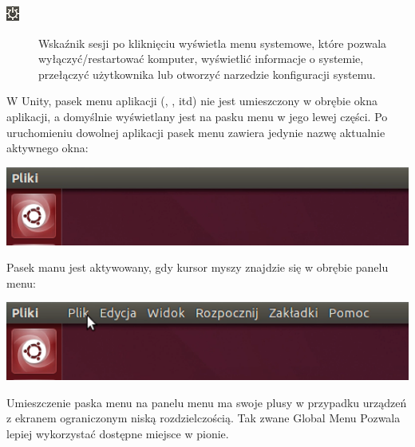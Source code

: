 \begin{description}
\item[\includegraphics{images/unity_wskaznik_system.png}]\textcolor{ubuntu_orange}{Wskaźnik sesji} po kliknięciu wyświetla menu systemowe, które pozwala wyłączyć/restartować komputer, wyświetlić informacje o systemie, przełączyć użytkownika lub otworzyć narzedzie konfiguracji systemu.
\end{description}


W Unity, pasek menu aplikacji (, ,  itd) nie jest umieszczony w obrębie okna aplikacji, a domyślnie wyświetlany jest na pasku menu w jego lewej części. Po uruchomieniu dowolnej aplikacji pasek menu zawiera jedynie nazwę aktualnie aktywnego okna:

\begin{center}
	\includegraphics[width=\linewidth]{images/unity_menu_bar2.png}
\end{center}

Pasek manu jest aktywowany, gdy kursor myszy znajdzie się w obrębie panelu menu:

\begin{center}
	\includegraphics[width=\linewidth]{images/unity_menu_bar3.png}
\end{center}

Umieszczenie paska menu na panelu menu ma swoje plusy w przypadku urządzeń z ekranem ograniczonym niską rozdzielczością. Tak zwane \textcolor{ubuntu_orange}{Global Menu} Pozwala lepiej wykorzystać dostępne miejsce w pionie.